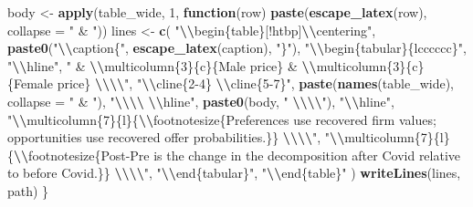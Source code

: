 \documentclass[
]{article}
\newenvironment{Shaded}{\begin{snugshade}}{\end{snugshade}}
\newcommand{\AttributeTok}[1]{\textcolor[rgb]{0.13,0.29,0.53}{#1}}
\newcommand{\ControlFlowTok}[1]{\textcolor[rgb]{0.13,0.29,0.53}{\textbf{#1}}}
\newcommand{\DecValTok}[1]{\textcolor[rgb]{0.00,0.00,0.81}{#1}}
\newcommand{\FunctionTok}[1]{\textcolor[rgb]{0.13,0.29,0.53}{\textbf{#1}}}
\newcommand{\NormalTok}[1]{#1}
\newcommand{\OtherTok}[1]{\textcolor[rgb]{0.56,0.35,0.01}{#1}}
\newcommand{\SpecialCharTok}[1]{\textcolor[rgb]{0.81,0.36,0.00}{\textbf{#1}}}
\newcommand{\StringTok}[1]{\textcolor[rgb]{0.31,0.60,0.02}{#1}}
\begin{document}
\begin{Shaded}
\begin{Highlighting}[]
\NormalTok{    body }\OtherTok{\textless{}{-}} \FunctionTok{apply}\NormalTok{(table\_wide, }\DecValTok{1}\NormalTok{, }\ControlFlowTok{function}\NormalTok{(row) }\FunctionTok{paste}\NormalTok{(}\FunctionTok{escape\_latex}\NormalTok{(row), }\AttributeTok{collapse =} \StringTok{" \& "}\NormalTok{))}
\NormalTok{    lines }\OtherTok{\textless{}{-}} \FunctionTok{c}\NormalTok{(}
        \StringTok{"}\SpecialCharTok{\textbackslash{}\textbackslash{}}\StringTok{begin\{table\}[!htbp]}\SpecialCharTok{\textbackslash{}\textbackslash{}}\StringTok{centering"}\NormalTok{,}
        \FunctionTok{paste0}\NormalTok{(}\StringTok{"}\SpecialCharTok{\textbackslash{}\textbackslash{}}\StringTok{caption\{"}\NormalTok{, }\FunctionTok{escape\_latex}\NormalTok{(caption), }\StringTok{"\}"}\NormalTok{),}
        \StringTok{"}\SpecialCharTok{\textbackslash{}\textbackslash{}}\StringTok{begin\{tabular\}\{lcccccc\}"}\NormalTok{,}
        \StringTok{"}\SpecialCharTok{\textbackslash{}\textbackslash{}}\StringTok{hline"}\NormalTok{,}
        \StringTok{" \& }\SpecialCharTok{\textbackslash{}\textbackslash{}}\StringTok{multicolumn\{3\}\{c\}\{Male price\} \& }\SpecialCharTok{\textbackslash{}\textbackslash{}}\StringTok{multicolumn\{3\}\{c\}\{Female price\} }\SpecialCharTok{\textbackslash{}\textbackslash{}\textbackslash{}\textbackslash{}}\StringTok{"}\NormalTok{,}
        \StringTok{"}\SpecialCharTok{\textbackslash{}\textbackslash{}}\StringTok{cline\{2{-}4\} }\SpecialCharTok{\textbackslash{}\textbackslash{}}\StringTok{cline\{5{-}7\}"}\NormalTok{,}
        \FunctionTok{paste}\NormalTok{(}\FunctionTok{names}\NormalTok{(table\_wide), }\AttributeTok{collapse =} \StringTok{" \& "}\NormalTok{),}
        \StringTok{"}\SpecialCharTok{\textbackslash{}\textbackslash{}\textbackslash{}\textbackslash{}}\StringTok{ }\SpecialCharTok{\textbackslash{}\textbackslash{}}\StringTok{hline"}\NormalTok{,}
        \FunctionTok{paste0}\NormalTok{(body, }\StringTok{" }\SpecialCharTok{\textbackslash{}\textbackslash{}\textbackslash{}\textbackslash{}}\StringTok{"}\NormalTok{),}
        \StringTok{"}\SpecialCharTok{\textbackslash{}\textbackslash{}}\StringTok{hline"}\NormalTok{,}
        \StringTok{"}\SpecialCharTok{\textbackslash{}\textbackslash{}}\StringTok{multicolumn\{7\}\{l\}\{}\SpecialCharTok{\textbackslash{}\textbackslash{}}\StringTok{footnotesize\{Preferences use recovered firm values; opportunities use recovered offer probabilities.\}\} }\SpecialCharTok{\textbackslash{}\textbackslash{}\textbackslash{}\textbackslash{}}\StringTok{"}\NormalTok{,}
        \StringTok{"}\SpecialCharTok{\textbackslash{}\textbackslash{}}\StringTok{multicolumn\{7\}\{l\}\{}\SpecialCharTok{\textbackslash{}\textbackslash{}}\StringTok{footnotesize\{Post{-}Pre is the change in the decomposition after Covid relative to before Covid.\}\} }\SpecialCharTok{\textbackslash{}\textbackslash{}\textbackslash{}\textbackslash{}}\StringTok{"}\NormalTok{,}
        \StringTok{"}\SpecialCharTok{\textbackslash{}\textbackslash{}}\StringTok{end\{tabular\}"}\NormalTok{,}
        \StringTok{"}\SpecialCharTok{\textbackslash{}\textbackslash{}}\StringTok{end\{table\}"}
\NormalTok{    )}
    \FunctionTok{writeLines}\NormalTok{(lines, path)}
\NormalTok{\}}


\end{Highlighting}
\end{Shaded}
\end{document}
